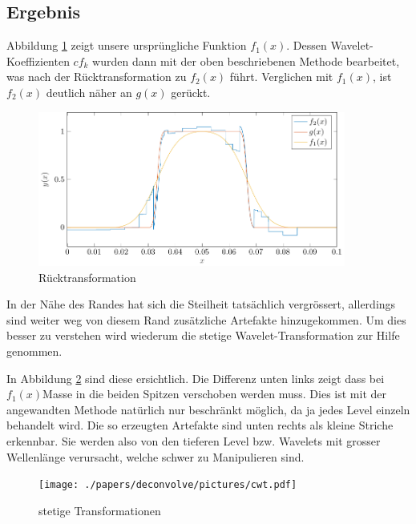 \subsection{Ergebnis}
Abbildung \ref{deconvolve:result_1d} zeigt unsere ursprüngliche Funktion $f_1(x)$.
Dessen Wavelet-Koeffizienten $cf_k$ wurden dann mit der oben beschriebenen Methode bearbeitet, was nach der Rücktransformation zu $f_2(x)$ führt.
Verglichen mit $f_1(x)$, ist $f_2(x)$ deutlich näher an $g(x)$ gerückt.
\begin{figure}[h]
\centering
\includegraphics[width=0.9\textwidth]{./papers/deconvolve/pictures/result_1d.pdf}
\caption{Rücktransformation\label{deconvolve:result_1d}}
\end{figure}

In der Nähe des Randes hat sich die Steilheit tatsächlich vergrössert, allerdings sind weiter weg von diesem Rand zusätzliche Artefakte hinzugekommen.
Um dies besser zu verstehen wird wiederum die stetige Wavelet-Transformation zur Hilfe genommen.

In Abbildung \ref{deconvolve:cwt} sind diese ersichtlich.
Die Differenz unten links zeigt dass bei $f_1(x)$\glqq Masse \grqq{} in die beiden Spitzen verschoben werden muss.
Dies ist mit der angewandten Methode natürlich nur beschränkt möglich, da ja jedes Level einzeln behandelt wird.
Die so erzeugten Artefakte sind unten rechts als kleine Striche erkennbar.
Sie werden also von den tieferen Level bzw. Wavelets mit grosser \glqq Wellenlänge \grqq{} verursacht, welche schwer zu Manipulieren sind.
\begin{figure}[h]
\centering
\texttt{[image: ./papers/deconvolve/pictures/cwt.pdf]}
\caption{stetige Transformationen\label{deconvolve:cwt}}
\end{figure}
